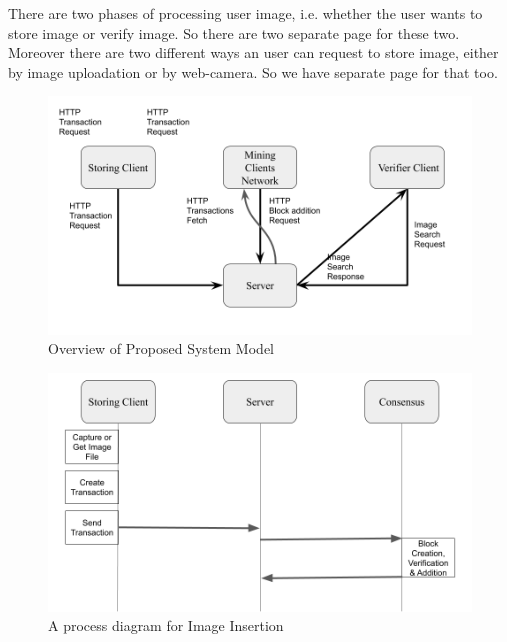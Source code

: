 There are two phases of processing user image, i.e. whether the user wants to store image or verify image. So there are two separate page for these two. Moreover there are two different ways an user can request to store image, either by image uploadation or by web-camera. So we have separate page for that too.

\begin{figure}
\begin{center}
\includegraphics[width=\textwidth]{./img_src/setup.png}
\end{center}
\label{fig_setup}
\caption{Overview of Proposed System Model}
\end{figure}

\begin{figure}
\begin{center}
\includegraphics[width=\textwidth]{./img_src/img_store.png}
\end{center}
\label{fig_imgStore}
\caption{A process diagram for Image Insertion}
\end{figure}

